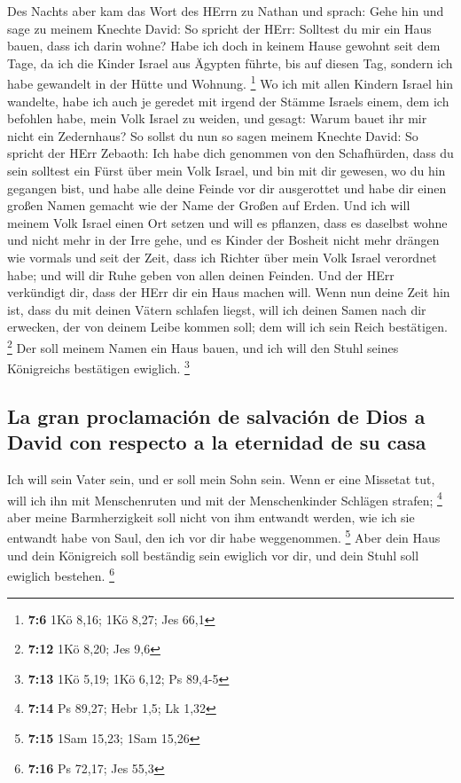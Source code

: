  Des Nachts aber kam das Wort des HErrn zu Nathan und
sprach:  Gehe hin und sage zu meinem Knechte David: So
spricht der HErr: Solltest du mir ein Haus bauen, dass ich darin wohne?
 Habe ich doch in keinem Hause gewohnt seit dem Tage, da
ich die Kinder Israel aus Ägypten führte, bis auf diesen Tag, sondern
ich habe gewandelt in der Hütte und Wohnung. \footnote{\textbf{7:6} 1Kö
  8,16; 1Kö 8,27; Jes 66,1}  Wo ich mit allen Kindern
Israel hin wandelte, habe ich auch je geredet mit irgend der Stämme
Israels einem, dem ich befohlen habe, mein Volk Israel zu weiden, und
gesagt: Warum bauet ihr mir nicht ein Zedernhaus?  So
sollst du nun so sagen meinem Knechte David: So spricht der HErr
Zebaoth: Ich habe dich genommen von den Schafhürden, dass du sein
solltest ein Fürst über mein Volk Israel,  und bin mit dir
gewesen, wo du hin gegangen bist, und habe alle deine Feinde vor dir
ausgerottet und habe dir einen großen Namen gemacht wie der Name der
Großen auf Erden.  Und ich will meinem Volk Israel einen
Ort setzen und will es pflanzen, dass es daselbst wohne und nicht mehr
in der Irre gehe, und es Kinder der Bosheit nicht mehr drängen wie
vormals und seit der Zeit, dass ich Richter über mein Volk Israel
verordnet habe;  und will dir Ruhe geben von allen deinen
Feinden. Und der HErr verkündigt dir, dass der HErr dir ein Haus machen
will.  Wenn nun deine Zeit hin ist, dass du mit deinen
Vätern schlafen liegst, will ich deinen Samen nach dir erwecken, der von
deinem Leibe kommen soll; dem will ich sein Reich bestätigen.
\footnote{\textbf{7:12} 1Kö 8,20; Jes 9,6}  Der soll
meinem Namen ein Haus bauen, und ich will den Stuhl seines Königreichs
bestätigen ewiglich. \footnote{\textbf{7:13} 1Kö 5,19; 1Kö 6,12; Ps
  89,4-5}

\hypertarget{la-gran-proclamaciuxf3n-de-salvaciuxf3n-de-dios-a-david-con-respecto-a-la-eternidad-de-su-casa}{%
\subsection{La gran proclamación de salvación de Dios a David con
respecto a la eternidad de su
casa}\label{la-gran-proclamaciuxf3n-de-salvaciuxf3n-de-dios-a-david-con-respecto-a-la-eternidad-de-su-casa}}

 Ich will sein Vater sein, und er soll mein Sohn sein.
Wenn er eine Missetat tut, will ich ihn mit Menschenruten und mit der
Menschenkinder Schlägen strafen; \footnote{\textbf{7:14} Ps 89,27; Hebr
  1,5; Lk 1,32}  aber meine Barmherzigkeit soll nicht von
ihm entwandt werden, wie ich sie entwandt habe von Saul, den ich vor dir
habe weggenommen. \footnote{\textbf{7:15} 1Sam 15,23; 1Sam 15,26}
 Aber dein Haus und dein Königreich soll beständig sein
ewiglich vor dir, und dein Stuhl soll ewiglich bestehen. \footnote{\textbf{7:16}
  Ps 72,17; Jes 55,3}

